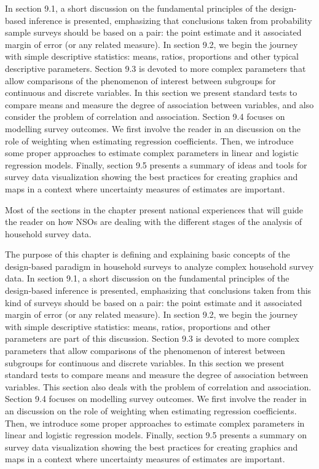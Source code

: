 \documentclass[
  12pt,
]{book}
\begin{document}
In section 9.1, a short discussion on the fundamental principles of the design-based inference is presented, emphasizing that conclusions taken from probability sample surveys should be based on a pair: the point estimate and it associated margin of error (or any related measure). In section 9.2, we begin the journey with simple descriptive statistics: means, ratios, proportions and other typical descriptive parameters. Section 9.3 is devoted to more complex parameters that allow comparisons of the phenomenon of interest between subgroups for continuous and discrete variables. In this section we present standard tests to compare means and measure the degree of association between variables, and also consider the problem of correlation and association. Section 9.4 focuses on modelling survey outcomes. We first involve the reader in an discussion on the role of weighting when estimating regression coefficients. Then, we introduce some proper approaches to estimate complex parameters in linear and logistic regression models. Finally, section 9.5 presents a summary of ideas and tools for survey data visualization showing the best practices for creating graphics and maps in a context where uncertainty measures of estimates are important.

Most of the sections in the chapter present national experiences that will guide the reader on how NSOs are dealing with the different stages of the analysis of household survey data.

The purpose of this chapter is defining and explaining basic concepts of the design-based paradigm in household surveys to analyze complex household survey data. In section 9.1, a short discussion on the fundamental principles of the design-based inference is presented, emphasizing that conclusions taken from this kind of surveys should be based on a pair: the point estimate and it associated margin of error (or any related measure). In section 9.2, we begin the journey with simple descriptive statistics: means, ratios, proportions and other parameters are part of this discussion. Section 9.3 is devoted to more complex parameters that allow comparisons of the phenomenon of interest between subgroups for continuous and discrete variables. In this section we present standard tests to compare means and measure the degree of association between variables. This section also deals with the problem of correlation and association. Section 9.4 focuses on modelling survey outcomes. We first involve the reader in an discussion on the role of weighting when estimating regression coefficients. Then, we introduce some proper approaches to estimate complex parameters in linear and logistic regression models. Finally, section 9.5 presents a summary on survey data visualization showing the best practices for creating graphics and maps in a context where uncertainty measures of estimates are important.
\end{document}
